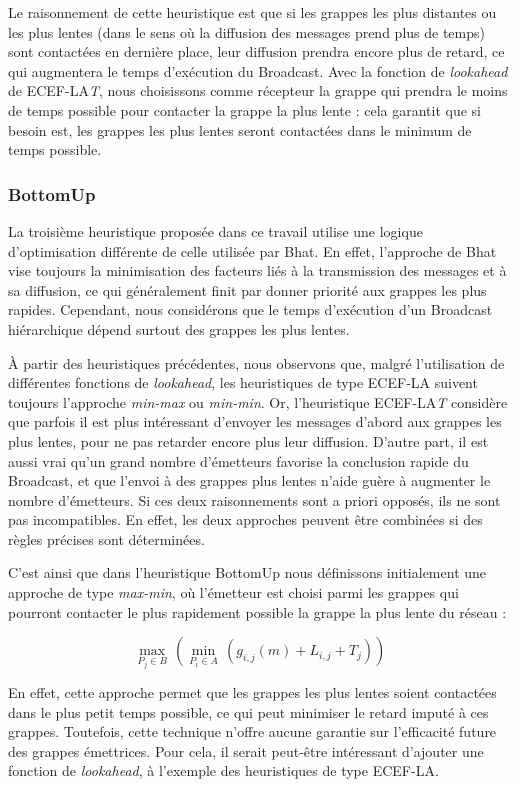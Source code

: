 Le raisonnement de cette heuristique est que si les grappes les plus
distantes ou les plus lentes (dans le sens où la diffusion des messages
prend plus de temps) sont contactées en dernière place, leur diffusion
prendra encore plus de retard, ce qui augmentera le temps d'exécution
du Broadcast. Avec la fonction de \emph{lookahead} de ECEF-LA\emph{T},
nous choisissons comme récepteur la grappe qui prendra le moins de
temps possible pour contacter la grappe la plus lente : cela garantit
que si besoin est, les grappes les plus lentes seront contactées dans
le minimum de temps possible.


\subsubsection*{BottomUp}

La troisième heuristique proposée dans ce travail utilise une logique
d'optimisation différente de celle utilisée par Bhat. En effet, l'approche
de Bhat vise toujours la minimisation des facteurs liés à la transmission
des messages et à sa diffusion, ce qui généralement finit par donner
priorité aux grappes les plus rapides. Cependant, nous considérons
que le temps d'exécution d'un Broadcast hiérarchique dépend surtout
des grappes les plus lentes.

À partir des heuristiques précédentes, nous observons que, malgré
l'utilisation de différentes fonctions de \emph{lookahead}, les heuristiques
de type ECEF-LA suivent toujours l'approche \emph{min-max} ou \emph{min-min}.
Or, l'heuristique ECEF-LA\emph{T} considère que parfois il est plus
intéressant d'envoyer les messages d'abord aux grappes les plus lentes,
pour ne pas retarder encore plus leur diffusion. D'autre part, il
est aussi vrai qu'un grand nombre d'émetteurs favorise la conclusion
rapide du Broadcast, et que l'envoi à des grappes plus lentes n'aide
guère à augmenter le nombre d'émetteurs. Si ces deux raisonnements
sont a priori opposés, ils ne sont pas incompatibles. En effet, les
deux approches peuvent être combinées si des règles précises sont
déterminées.

C'est ainsi que dans l'heuristique BottomUp nous définissons initialement
une approche de type \emph{max-min}, où l'émetteur est choisi parmi
les grappes qui pourront contacter le plus rapidement possible la
grappe la plus lente du réseau :

\[
\max_{P_{j}\in B}\,(\min_{P_{i}\in A}\,(g_{i,j}(m)+L_{i,j}+T_{j}))\]


En effet, cette approche permet que les grappes les plus lentes soient
contactées dans le plus petit temps possible, ce qui peut minimiser
le retard imputé à ces grappes. Toutefois, cette technique n'offre
aucune garantie sur l'efficacité future des grappes émettrices. Pour
cela, il serait peut-être intéressant d'ajouter une fonction de \emph{lookahead},
à l'exemple des heuristiques de type ECEF-LA.


